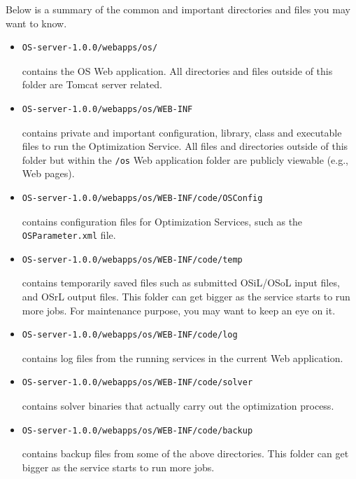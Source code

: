 \documentclass[11pt]{article}
\renewcommand{\_}{{\char"5F}}
\renewcommand{\{}{{\char"7B}}
\renewcommand{\}}{{\char"7D}}
\renewcommand{\^}{{\char"0D}}
\renewcommand{\'}{{\char"0D}}
\begin{document}
\begin{enumerate}[Step 1:]
\vskip 8pt

Below is a summary of the common and important directories and files you may want to know.

\begin{itemize}
\item
\begin{verbatim}
OS-server-1.0.0/webapps/os/
\end{verbatim}
contains the OS Web application. All directories and files outside of this folder are Tomcat server related.
\item
\begin{verbatim}
OS-server-1.0.0/webapps/os/WEB-INF
\end{verbatim}
contains private and important configuration, library, class and executable files to run the Optimization Service.
All files and directories outside of this folder but within the {\tt /os} Web application folder are publicly viewable (e.g., Web pages).
\item
\begin{verbatim}
OS-server-1.0.0/webapps/os/WEB-INF/code/OSConfig
\end{verbatim}
contains configuration files for Optimization Services, such as the {\tt OSParameter.xml} file.
\item
\begin{verbatim}
OS-server-1.0.0/webapps/os/WEB-INF/code/temp
\end{verbatim}
contains temporarily saved files such as submitted OSiL/OSoL input files, and OSrL output files. This folder can get bigger as the service starts to run more jobs. For maintenance purpose, you may want to keep an eye on it.
\item
\begin{verbatim}
OS-server-1.0.0/webapps/os/WEB-INF/code/log
\end{verbatim}
contains log files from the running services in the current Web application.
\item
\begin{verbatim}
OS-server-1.0.0/webapps/os/WEB-INF/code/solver
\end{verbatim}
contains solver binaries that actually carry out the optimization process.
\item
\begin{verbatim}
OS-server-1.0.0/webapps/os/WEB-INF/code/backup
\end{verbatim}
contains backup files from some of the above directories. This folder can get bigger as the service starts to run more jobs.

\end{itemize}
\end{enumerate}
\end{document}

